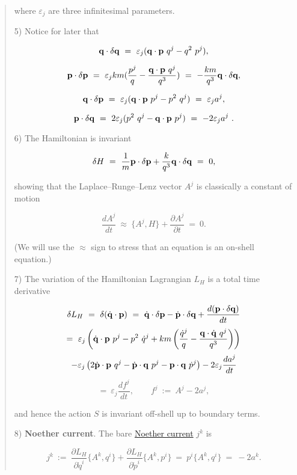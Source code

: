 \documentclass{article}
\numberwithin{equation}{subsection} %
\theoremstyle{definition}
\begin{document}
\begin{quote}
        where $\varepsilon_j$ are three infinitesimal parameters.

        5) Notice for later that

        $$ {\bf q}\cdot\delta {\bf q}~=~\varepsilon_j({\bf q}\cdot{\bf p}~q^j - q^2~p^j),  $$

        $$ {\bf p}\cdot\delta {\bf p}
        ~=~\varepsilon_j km(\frac{p^j}{q}-\frac{{\bf q}\cdot{\bf p}~q^j}{q^3})~=~- \frac{km}{q^3}{\bf q}\cdot\delta {\bf q},  $$

        $$ {\bf q}\cdot\delta {\bf p}~=~\varepsilon_j({\bf q}\cdot{\bf p}~p^j - p^2~q^j )~=~\varepsilon_j a^j,  $$

        $$ {\bf p}\cdot\delta {\bf q}~=~2\varepsilon_j( p^2~q^j - {\bf q}\cdot{\bf p}~p^j)~=~-2\varepsilon_j a^j~.  $$

        6) The Hamiltonian is invariant

        $$ \delta  H ~=~ \frac{1}{m}{\bf p}\cdot\delta {\bf p} + \frac{k}{q^3}{\bf q}\cdot\delta {\bf q}~=~0, $$

        showing that the Laplace–Runge–Lenz vector $A^j$ is classically a constant of motion 

        $$\frac{dA^j}{dt} ~\approx~ \{ A^j, H\}+\frac{\partial A^j}{\partial t} ~=~  0.$$   

        (We will use the $\approx$ sign to stress that an equation is an on-shell equation.) 

        7) The variation of the Hamiltonian Lagrangian $L_H$ is a total time derivative

        $$ \delta L_H~=~ \delta  (\dot{\bf q}\cdot{\bf p})~=~ \dot{\bf q}\cdot\delta {\bf p} - \dot{\bf p}\cdot\delta {\bf q} + \frac{d({\bf p}\cdot\delta {\bf q})}{dt} $$
        $$  =~ \varepsilon_j\left( \dot{\bf q}\cdot{\bf p}~p^j - p^2~\dot{q}^j +  km\left( \frac{\dot{q}^j}{q} -  \frac{{\bf q} \cdot \dot{\bf q}~q^j}{q^3}\right)\right)    $$
        $$- \varepsilon_j\left(2 \dot{\bf p}\cdot{\bf p}~q^j - \dot{\bf p}\cdot{\bf q}~p^j- {\bf p}\cdot{\bf q}~\dot{p}^j  \right) - 2\varepsilon_j\frac{da^j}{dt}$$
        $$ =~\varepsilon_j\frac{df^j}{dt}, \qquad f^j ~:=~ A^j-2a^j, $$

        and hence the action $S$ is invariant off-shell up to boundary terms.

        8) \textbf{Noether current}. The bare \href{http://en.wikipedia.org/wiki/Noether%27s_theorem}{Noether current} $j^k$ is

        $$j^k~:=~ \frac{\partial L_H}{\partial \dot{q}^i}  \{A^k,q^i\}+\frac{\partial L_H}{\partial \dot{p}^i}  \{A^k,p^i\}
        ~=~ p^i\{A^k,q^i\}~=~ -2a^k. $$


\end{quote}
\end{document}
